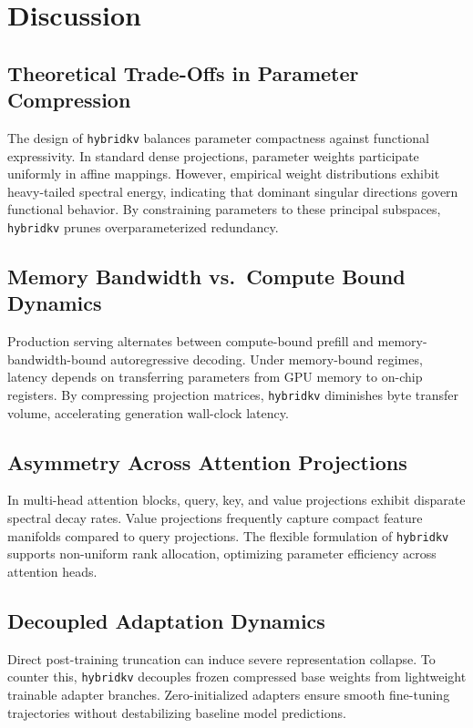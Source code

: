 \section{Discussion}

\subsection{Theoretical Trade-Offs in Parameter Compression}
The design of \texttt{hybridkv} balances parameter compactness against functional expressivity. In standard dense projections, parameter weights participate uniformly in affine mappings. However, empirical weight distributions exhibit heavy-tailed spectral energy, indicating that dominant singular directions govern functional behavior. By constraining parameters to these principal subspaces, \texttt{hybridkv} prunes overparameterized redundancy.

\subsection{Memory Bandwidth vs.\ Compute Bound Dynamics}
Production serving alternates between compute-bound prefill and memory-bandwidth-bound autoregressive decoding. Under memory-bound regimes, latency depends on transferring parameters from GPU memory to on-chip registers. By compressing projection matrices, \texttt{hybridkv} diminishes byte transfer volume, accelerating generation wall-clock latency.

\subsection{Asymmetry Across Attention Projections}
In multi-head attention blocks, query, key, and value projections exhibit disparate spectral decay rates. Value projections frequently capture compact feature manifolds compared to query projections. The flexible formulation of \texttt{hybridkv} supports non-uniform rank allocation, optimizing parameter efficiency across attention heads.

\subsection{Decoupled Adaptation Dynamics}
Direct post-training truncation can induce severe representation collapse. To counter this, \texttt{hybridkv} decouples frozen compressed base weights from lightweight trainable adapter branches. Zero-initialized adapters ensure smooth fine-tuning trajectories without destabilizing baseline model predictions.

